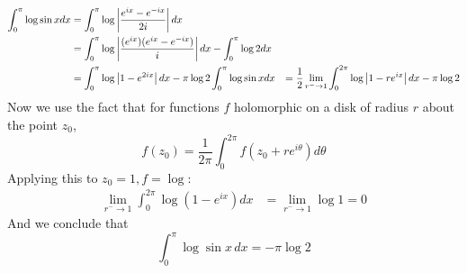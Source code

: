 \documentclass{homework}
\begin{document}
                                                                                         \begin{solution}
                                                                                         \begin{align*}
                                                                                         \int_0^\pi \log \sin x dx &= \int_0^\pi \log \left|\frac{e^{ix} - e^{-ix}}{2i}\right| dx\\
                                                                                         &= \int_0^\pi \log \left|\frac{(e^{ix})(e^{ix} - e^{-ix})}{i}\right| dx - \int_0^\pi \log 2 dx \\
                                                                                         &= \int_0^\pi \log \left|1 - e^{2ix}\right| dx - \pi \log 2
                                                                                         \int_0^\pi \log \sin x dx &= \frac{1}{2}\lim_{r^- \to 1}\int_0^{2\pi} \log \left|1 - re^{ix}\right| dx - \pi \log 2\\
                                                                                         \end{align*}
                                                                                         Now we use the fact that for functions $f$ holomorphic on a disk of radius $r$ about the point $z_0$, 
                                                                                         \[
                                                                                         f(z_0) = \frac{1}{2\pi}\int_0^{2\pi} f(z_0+re^{i\theta})d\theta
                                                                                         \]
                                                                                         Applying this to $z_0=1, f=\log$:
                                                                                         \begin{align*}
                                                                                         \lim_{r^- \to 1}\int_0^{2\pi} \log (1 - e^{ix}) dx &= \lim_{r^-\to 1} \log 1 = 0
                                                                                         \end{align*}
                                                                                         And we conclude that
                                                                                         \[
                                                                                         \int_0^\pi \log \sin x \, dx = -\pi\log 2
                                                                                         \]
                                                                                         \end{solution}
\end{document}
